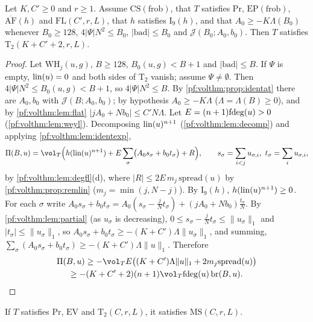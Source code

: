 \begin{proposition}[$\mathrm{T}_2$]\label{pf:volthm:prop:T2}
Let $K,C'\ge0$ and $r\ge1$. Assume $\mathrm{CS}(\mathrm{frob})$, that $T$ satisfies $\mathrm{Pr}$,
$\mathrm{EP}(\mathrm{frob})$, $\overline{\mathrm{AF}}(h)$ and $\mathrm{FL}(C',r,L)$, that $h$ satisfies $\mathrm{I}_9(h)$,
and that $A_0\ge-K\Lambda(B_0)$ whenever $B_0\ge128$, $4|\Psi|N^2\le B_0$, $|\mathrm{bad}|\le B_0$ and
$\mathcal J(B_0;A_0,b_0)$. Then $T$ satisfies $\mathrm{T}_2(K+C'+2,r,L)$.
\end{proposition}

\begin{proof}
Let $\mathrm{WH}_j(u,g)$, $B\ge128$, $B_0(u,g)<B+1$ and $|\mathrm{bad}|\le B$. If $\Psi$ is empty, $\mathrm{lin}(u)=0$
and both sides of $\mathrm{T}_2$ vanish; assume $\Psi\ne\emptyset$. Then $4|\Psi|N^2\le B_0(u,g)<B+1$, so
$4|\Psi|N^2\le B$. By \cref{pf:volthm:prop:identat} there are $A_0,b_0$ with $\mathcal J(B;A_0,b_0)$; by
hypothesis $A_0\ge-K\Lambda$ ($\Lambda=\Lambda(B)\ge0$), and by \cref{pf:volthm:lem:flat}
$|jA_0+Nb_0|\le C'N\Lambda$. Let $E=(n+1)\mathrm{fdeg}(u)>0$ (\cref{pf:volthm:lem:weyl}). Decomposing
$\mathrm{lin}(u)^{n+1}$ (\cref{pf:volthm:lem:decomp}) and applying \cref{pf:volthm:lem:identexp},
\[
\Pi(B,u)=\vol_T\Bigl(h(\volthmlin(u)^{n+1})+E\sum_\sigma\bigl(A_0s_\sigma+b_0t_\sigma\bigr)+R\Bigr),\qquad
s_\sigma=\sum_{i<j}u_{\sigma,i},\ t_\sigma=\sum_iu_{\sigma,i},
\]
by \cref{pf:volthm:lem:degfl}(d), where $|R|\le2E\,m_j\,\mathrm{spread}(u)$ by \cref{pf:volthm:prop:remlin}
($m_j=\min(j,N-j)$). By $\mathrm{I}_9(h)$, $h(\mathrm{lin}(u)^{n+1})\ge0$. For each $\sigma$ write
$A_0s_\sigma+b_0t_\sigma=A_0(s_\sigma-\frac jNt_\sigma)+(jA_0+Nb_0)\frac{t_\sigma}N$. By \cref{pf:volthm:lem:partial}
(as $u_\sigma$ is decreasing), $0\le s_\sigma-\frac jNt_\sigma\le\|u_\sigma\|_1$ and $|t_\sigma|\le\|u_\sigma\|_1$, so
$A_0s_\sigma+b_0t_\sigma\ge-(K+C')\Lambda\|u_\sigma\|_1$, and summing,
$\sum_\sigma(A_0s_\sigma+b_0t_\sigma)\ge-(K+C')\Lambda\|u\|_1$. Therefore
\begin{multline*}
\Pi(B,u)\ge-\vol_TE\bigl((K+C')\Lambda\|u\|_1+2m_j\mathrm{spread}(u)\bigr)\\
\ge-(K+C'+2)(n+1)\vol_T\volthmfd(u)\,\mathrm{br}(B,u).\qedhere
\end{multline*}
\end{proof}

\begin{proposition}\label{pf:volthm:prop:meanslope}
If $T$ satisfies $\mathrm{Pr}$, $\mathrm{EV}$ and $\mathrm{T}_2(C,r,L)$, it satisfies
$\mathrm{MS}(C,r,L)$.
\end{proposition}

